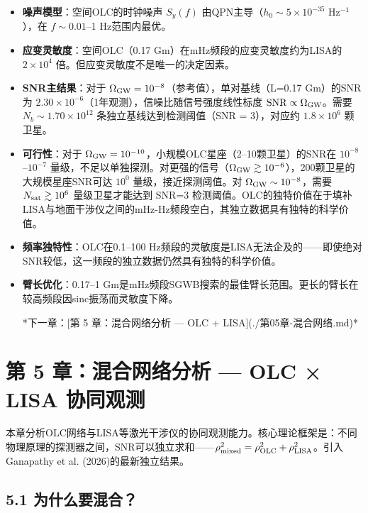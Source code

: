 \documentclass[12pt,a4paper]{article}
\begin{document}
\begin{itemize}
  \item[1] \textbf{噪声模型}：空间OLC的时钟噪声 $S_y(f)$ 由QPN主导（$h_0 \sim 5 \times 10^{-35}$ Hz$^{-1}$），在 $f \sim 0.01$–1 Hz范围内最优。

  \item[2] \textbf{应变灵敏度}：空间OLC（0.17 Gm）在mHz频段的应变灵敏度约为LISA的 $2 \times 10^4$ 倍。但应变灵敏度不是唯一的决定因素。

  \item[3] \textbf{SNR主结果}：对于 $\Omega_{\rm GW} = 10^{-8}$（参考值），单对基线（L=0.17 Gm）的SNR为 $2.30 \times 10^{-6}$（1年观测），信噪比随信号强度线性标度 ${\rm SNR} \propto \Omega_{\rm GW}$。需要 $N_b \sim 1.70 \times 10^{12}$ 条独立基线达到检测阈值（SNR = 3），对应约 $1.8 \times 10^6$ 颗卫星。

  \item[4] \textbf{可行性}：对于 $\Omega_{\rm GW} = 10^{-10}$，小规模OLC星座（2–10颗卫星）的SNR在 $10^{-8}$–$10^{-7}$ 量级，不足以单独探测。对更强的信号（$\Omega_{\rm GW} \gtrsim 10^{-6}$），200颗卫星的大规模星座SNR可达 $10^0$ 量级，接近探测阈值。对 $\Omega_{\rm GW} \sim 10^{-8}$，需要 $N_{\rm sat} \gtrsim 10^6$ 量级卫星才能达到 SNR=3 检测阈值。OLC的独特价值在于填补LISA与地面干涉仪之间的mHz-Hz频段空白，其独立数据具有独特的科学价值。

  \item[5] \textbf{频率独特性}：OLC在0.1–100 Hz频段的灵敏度是LISA无法企及的——即使绝对SNR较低，这一频段的独立数据仍然具有独特的科学价值。

  \item[6] \textbf{臂长优化}：0.17–1 Gm是mHz频段SGWB搜索的最佳臂长范围。更长的臂长在较高频段因sinc振荡而灵敏度下降。


*下一章：[第 5 章：混合网络分析 — OLC + LISA](./第05章-混合网络.md)*

\end{itemize}
\section{第 5 章：混合网络分析 — OLC × LISA 协同观测}


本章分析OLC网络与LISA等激光干涉仪的协同观测能力。核心理论框架是：不同物理原理的探测器之间，SNR可以独立求和——$\rho_{\rm mixed}^2 = \rho_{\rm OLC}^2 + \rho_{\rm LISA}^2$。引入Ganapathy et al. (2026)的最新独立结果。

\subsection{5.1 为什么要混合？}
\end{document}
